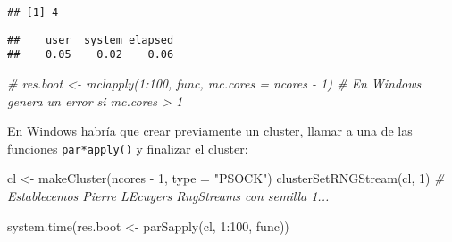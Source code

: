 \documentclass[
]{book}
\newenvironment{Shaded}{\begin{snugshade}}{\end{snugshade}}
\newcommand{\AttributeTok}[1]{\textcolor[rgb]{0.77,0.63,0.00}{#1}}
\newcommand{\CommentTok}[1]{\textcolor[rgb]{0.56,0.35,0.01}{\textit{#1}}}
\newcommand{\ConstantTok}[1]{\textcolor[rgb]{0.00,0.00,0.00}{#1}}
\newcommand{\ControlFlowTok}[1]{\textcolor[rgb]{0.13,0.29,0.53}{\textbf{#1}}}
\newcommand{\DecValTok}[1]{\textcolor[rgb]{0.00,0.00,0.81}{#1}}
\newcommand{\FunctionTok}[1]{\textcolor[rgb]{0.00,0.00,0.00}{#1}}
\newcommand{\NormalTok}[1]{#1}
\newcommand{\OtherTok}[1]{\textcolor[rgb]{0.56,0.35,0.01}{#1}}
\newcommand{\SpecialCharTok}[1]{\textcolor[rgb]{0.00,0.00,0.00}{#1}}
\newcommand{\StringTok}[1]{\textcolor[rgb]{0.31,0.60,0.02}{#1}}
\theoremstyle{break}
\theoremstyle{definition}
\theoremstyle{definition}
\theoremstyle{definition}
\theoremstyle{definition}
\theoremstyle{remark}
\begin{document}
\begin{verbatim}
## [1] 4
\end{verbatim}

\begin{Shaded}
\end{Shaded}

\begin{verbatim}
##    user  system elapsed 
##    0.05    0.02    0.06
\end{verbatim}

\begin{Shaded}
\begin{Highlighting}[]
\CommentTok{\# res.boot \textless{}{-} mclapply(1:100, func, mc.cores = ncores {-} 1) \# En Windows genera un error si mc.cores \textgreater{} 1}
\end{Highlighting}
\end{Shaded}

En Windows habría que crear previamente un cluster, llamar a una de las funciones
\texttt{par*apply()} y finalizar el cluster:

\begin{Shaded}
\begin{Highlighting}[]
\NormalTok{cl }\OtherTok{\textless{}{-}} \FunctionTok{makeCluster}\NormalTok{(ncores }\SpecialCharTok{{-}} \DecValTok{1}\NormalTok{, }\AttributeTok{type =} \StringTok{"PSOCK"}\NormalTok{)}
\FunctionTok{clusterSetRNGStream}\NormalTok{(cl, }\DecValTok{1}\NormalTok{) }\CommentTok{\# Establecemos Pierre L\textquotesingle{}Ecuyer\textquotesingle{}s RngStreams con semilla 1...}

\FunctionTok{system.time}\NormalTok{(res.boot }\OtherTok{\textless{}{-}} \FunctionTok{parSapply}\NormalTok{(cl, }\DecValTok{1}\SpecialCharTok{:}\DecValTok{100}\NormalTok{, func))}
\end{Highlighting}
\end{Shaded}
\end{document}
